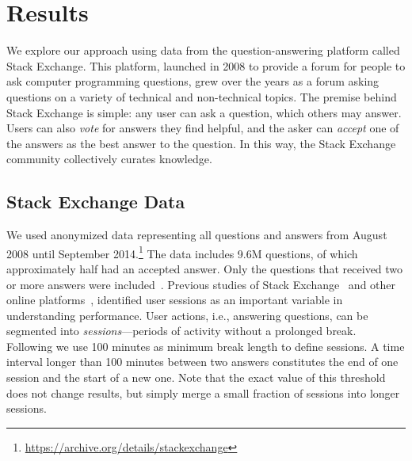 \section{Results}
\label{sec:results}

We explore our approach using data from the question-answering platform called Stack Exchange. This platform, launched in 2008 to provide a forum for people to ask computer programming questions, grew over the years as a forum asking questions on a variety of technical and non-technical topics.
The premise behind Stack Exchange is simple: any user can ask a question, which others may answer. Users can also \emph{vote} for answers they find helpful, and the asker can \emph{accept} one of the answers as the best answer to the question. In this way, the Stack Exchange community collectively curates knowledge.

\subsection{Stack Exchange Data}
We used anonymized data representing all questions and answers from August 2008 until September 2014.\footnote{\url{https://archive.org/details/stackexchange}} The data includes
9.6M questions, of which approximately half had an accepted answer.
Only the questions that received two or more answers were included~\cite{Burghardt2017myopia}.
Previous studies of Stack Exchange~\cite{Ferrara2017dynamics} and other online platforms~\cite{Agarwal2017quitting,Singer2016plosone}, identified user sessions as an important variable in understanding performance. User actions, i.e., answering questions, can be segmented into \emph{sessions}---periods of activity without a prolonged break. Following \cite{Ferrara2017dynamics} we use 100 minutes as minimum break length to define sessions. A time interval longer than 100 minutes between two answers constitutes the end of one session and the start of a new one. Note that the exact value of this threshold does not change results, but simply merge a small fraction of sessions into longer sessions.

